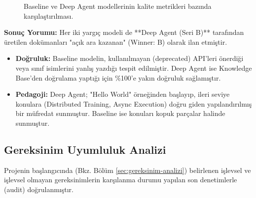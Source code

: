 \begin{figure}[H]
    \centering
    \caption{Baseline ve Deep Agent modellerinin kalite metrikleri bazında karşılaştırılması.}
    \label{fig:evaluation-comparison}
\end{figure}

\noindent\textbf{Sonuç Yorumu:}
Her iki yargıç modeli de **Deep Agent (Seri B)** tarafından üretilen dokümanları "açık ara kazanan" (Winner: B) olarak ilan etmiştir.
\begin{itemize}
    \item \textbf{Doğruluk:} Baseline modelin, kullanılmayan (deprecated) API'leri önerdiği veya sınıf isimlerini yanlış yazdığı tespit edilmiştir. Deep Agent ise Knowledge Base'den doğrulama yaptığı için \%100'e yakın doğruluk sağlamıştır.
    \item \textbf{Pedagoji:} Deep Agent; "Hello World" örneğinden başlayıp, ileri seviye konulara (Distributed Training, Async Execution) doğru giden yapılandırılmış bir müfredat sunmuştur. Baseline ise konuları kopuk parçalar halinde sunmuştur.
\end{itemize}

\subsection{Gereksinim Uyumluluk Analizi}

Projenin başlangıcında (Bkz. Bölüm \ref{sec:gereksinim-analizi}) belirlenen işlevsel ve işlevsel olmayan gereksinimlerin karşılanma durumu yapılan son denetimlerle (audit) doğrulanmıştır.

